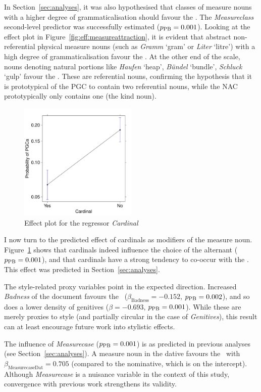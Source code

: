 In Section~\ref{sec:analyses}, it was also hypothesised that classes of measure nouns with a higher degree of grammaticalisation should favour the \NACa.
The \textit{Measureclass} second-level predictor was successfully estimated ($p_{\text{PB}}=0.001$).
Looking at the effect plot in Figure~\ref{fig:eff:measureattraction}, it is evident that abstract non-referential physical measure nouns (such as \textit{Gramm} `gram' or \textit{Liter} `litre') with a high degree of grammaticalisation favour the \NACa.
At the other end of the scale, nouns denoting natural portions like \textit{Haufen} `heap', \textit{Bündel} `bundle', \textit{Schluck} `gulp' favour the \PGCa.
These are referential nouns, confirming the hypothesis that it is prototypical of the PGC to contain two referential nouns, while the NAC prototypically only contains one (the kind noun).


\begin{figure}[h!]
  \centering
  \includegraphics[width=0.5\textwidth]{../R/output/corpus_Cardinal}
  \caption{Effect plot for the regressor \textit{Cardinal}}
  \label{fig:eff:leftcontext}
\end{figure}

I now turn to the predicted effect of cardinals as modifiers of the measure noun.
Figure~\ref{fig:eff:leftcontext} shows that cardinals indeed influence the choice of the alternant ($p_{\text{PB}}=0.001$), and that cardinals have a strong tendency to co-occur with the \NACa.
This effect was predicted in Section~\ref{sec:analyses}.


The style-related proxy variables point in the expected direction.
Increased \textit{Badness} of the document favours the \NACa\ ($\beta_{\text{Badness}}=-0.152$, $p_{\text{PB}}=0.002$), and so does a lower density of genitives ($\beta=-0.693$, $p_{\text{PB}}=0.001$).
While these are merely proxies to style (and partially circular in the case of \textit{Genitives}), this result can at least encourage future work into stylistic effects. 


The influence of \textit{Measurecase} ($p_{\text{PB}}=0.001$) is as predicted in previous analyses (see Section~\ref{sec:analyses}).
A measure noun in the dative favours the \PGCa\ with $\beta_{\text{MeasurecaseDat}}=0.705$ (compared to the nominative, which is on the intercept).
Although \textit{Measurecase} is a nuisance variable in the context of this study, convergence with previous work strengthens its validity.

